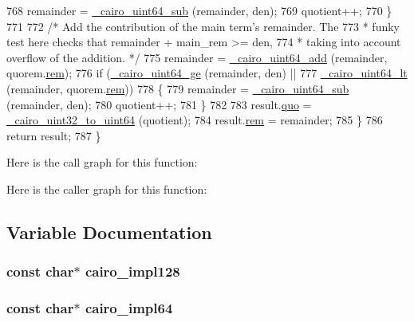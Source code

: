 \begin{DoxyCode}
768             remainder = \hyperlink{cairo-wideint-private_8h_a886253cbf8a04593b046e35bcf51c45c}{\_cairo\_uint64\_sub} (remainder, den);
769             quotient++;
770         \}
771 
772         \textcolor{comment}{/* Add the contribution of the main term's remainder. The}
773 \textcolor{comment}{         * funky test here checks that remainder + main\_rem >= den,}
774 \textcolor{comment}{         * taking into account overflow of the addition. */}
775         remainder = \hyperlink{cairo-wideint-private_8h_a233d42c3678deb29983fdead5483b03d}{\_cairo\_uint64\_add} (remainder, quorem.\hyperlink{struct__cairo__uquorem64_af360df0b81f94d6ac85f4cec13bb7431}{rem});
776         \textcolor{keywordflow}{if} (\hyperlink{cairo-wideint-private_8h_a5be6bbec2247f8f89c0904b9aa6fc012}{\_cairo\_uint64\_ge} (remainder, den) ||
777             \hyperlink{cairo-wideint-private_8h_a2cc85e3ec519a71b4c52f6e43affdace}{\_cairo\_uint64\_lt} (remainder, quorem.\hyperlink{struct__cairo__uquorem64_af360df0b81f94d6ac85f4cec13bb7431}{rem}))
778         \{
779             remainder = \hyperlink{cairo-wideint-private_8h_a886253cbf8a04593b046e35bcf51c45c}{\_cairo\_uint64\_sub} (remainder, den);
780             quotient++;
781         \}
782 
783         result.\hyperlink{struct__cairo__uquorem64_aa1ba1d4582ee46d1769ff01d63242ac8}{quo} = \hyperlink{cairo-wideint-private_8h_ae6926b42ba8d416207a6327091462d3d}{\_cairo\_uint32\_to\_uint64} (quotient);
784         result.\hyperlink{struct__cairo__uquorem64_af360df0b81f94d6ac85f4cec13bb7431}{rem} = remainder;
785     \}
786     \textcolor{keywordflow}{return} result;
787 \}
\end{DoxyCode}


Here is the call graph for this function\+:




Here is the caller graph for this function\+:




\subsection{Variable Documentation}
\subsubsection[{\texorpdfstring{cairo\+\_\+impl128}{cairo_impl128}}]{\setlength{\rightskip}{0pt plus 5cm}const char$\ast$ cairo\+\_\+impl128}\hypertarget{cairo-wideint-private_8h_a660c34af82df7595e1a029af6c5f799f}{}\label{cairo-wideint-private_8h_a660c34af82df7595e1a029af6c5f799f}
\subsubsection[{\texorpdfstring{cairo\+\_\+impl64}{cairo_impl64}}]{\setlength{\rightskip}{0pt plus 5cm}const char$\ast$ cairo\+\_\+impl64}\hypertarget{cairo-wideint-private_8h_a49cff5896e8f00bbdd461db2f8024ea1}{}\label{cairo-wideint-private_8h_a49cff5896e8f00bbdd461db2f8024ea1}

